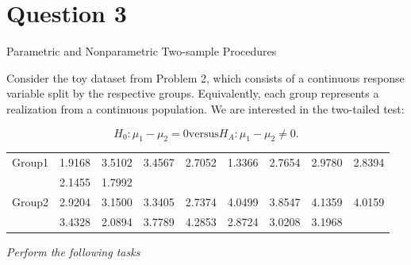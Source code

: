 \documentclass[letterpaper]{article}
\begin{document}
	\clearpage
	
	\section{Question 3}
	
	{\color{deepred} Parametric and Nonparametric Two-sample Procedures}
	
	
	Consider the toy dataset from Problem 2, which consists of a continuous response variable split by the respective groups. Equivalently, each group represents a realization from a continuous population. We are interested in the two-tailed test:
	
	\[
	H_0 : \mu_1 - \mu_2 = 0
	\text{versus} 
	H_A : \mu_1 - \mu_2 \ne 0.
	\]
	
	\begin{center}
		\begin{tabular}{lcccccccc}
			\hline
			Group1 & 1.9168 & 3.5102 & 3.4567 & 2.7052 & 1.3366 & 2.7654 & 2.9780 & 2.8394 \\
			& 2.1455 & 1.7992\\
			\hline
			Group2 & 2.9204 & 3.1500 & 3.3405 & 2.7374 & 4.0499 & 3.8547 & 4.1359 & 4.0159 \\
			& 3.4328 & 2.0894 & 3.7789 & 4.2853 & 2.8724 & 3.0208 & 3.1968
		\end{tabular}
	\end{center}
	
	\medskip
	
	\emph{Perform the following tasks}
	
\end{document}
